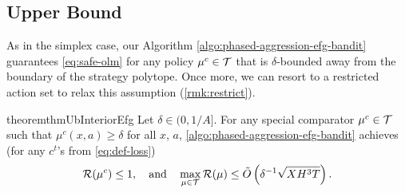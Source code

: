 \documentclass[11pt]{article}
\begin{document}
\subsection{Upper Bound} \label{sec:efg-upper}

As in the simplex case, our Algorithm \ref{algo:phased-aggression-efg-bandit} guarantees \cref{eq:safe-olm} for any policy $\mu^c\in \mathcal{T}$ that is $\delta$-bounded away from the boundary of the strategy polytope. Once more, we can resort to a restricted action set to relax this assumption (\cref{rmk:restrict}).

\begin{restatable}{theorem}{thmUbInteriorEfg} \label{thm:ub-interior-efg}
    Let $\delta \in (0,1/A]$. For any special comparator $\mu^c\in\mathcal{T}$ such that $\mu^c(x,a) \geq \delta$ for all $x$, $a$, \cref{algo:phased-aggression-efg-bandit} achieves (for any $c^t$'s from \cref{eq:def-loss})
    \begin{align*}
        \mathcal{R}(\mu^c) \leq 1, \quad \text{and} \quad \max_{\mu\in\mathcal{T}} \mathcal{R}(\mu) \leq \tilde{O}\left( \delta^{-1}\sqrt{XH^3T} \right).
    \end{align*}
\end{restatable}
\end{document}
